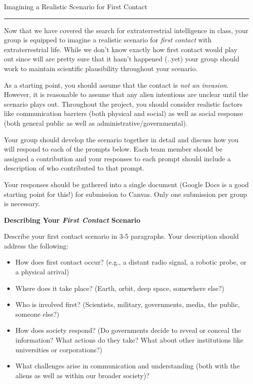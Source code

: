 \documentclass[12pt]{article}
\begin{document}
\vspace{1cm}
{\large{\noindent Imagining a Realistic Scenario for First Contact}}

\noindent\rule{6.5in}{0.4pt}

\noindent Now that we have covered the search for extraterrestrial intelligence
in class, your group is equipped to imagine a realistic scenario for \emph{first
contact} with extraterrestrial life. While we don't know exactly how first
contact would play out since will are pretty sure that it hasn't happened
(..yet) your group should work to maintain scientific plausibility throughout
your scenario. 

\vspace{0.3cm}
\noindent As a starting point, you should assume that the contact is \emph{not
an invasion}. However, it is reasonable to assume that any alien intentions are
unclear until the scenario plays out. Throughout the project, you should
consider realistic factors like communication barriers (both physical and
social) as well as social response (both general public as well as
administrative/governmental). 

\vspace{0.3cm}
\noindent Your group should develop the scenario together in detail and discuss
how you will respond to each of the prompts below. Each team member should be
assigned a contribution and your responses to each prompt should include a
description of who contributed to that prompt. 

\vspace{0.3cm}
\noindent Your responses should be gathered into a single document (Google Docs
is a good starting point for this!) for submission to Canvas. Only one
submission per group is necessary. 

\vspace{1cm}



{\bf{\noindent Describing Your \emph{First Contact} Scenario}}
\vspace{5pt}

\noindent Describe your first contact scenario in 3-5 paragraphs. Your
description should address the following:
\begin{itemize}
        \item How does first contact occur? (e.g., a distant radio signal, a
        robotic probe, or a physical arrival)
        \item Where does it take place? (Earth, orbit, deep space, somewhere
        else?)
        \item Who is involved first? (Scientists, military, governments, media,
        the public, someone else?)
        \item How does society respond? (Do governments decide to reveal or
        conceal the information? What actions do they take? What about other
        institutions like universities or corporations?)
        \item What challenges arise in communication and understanding (both
        with the aliens as well as within our broader society)?
\end{itemize}
\end{document}
